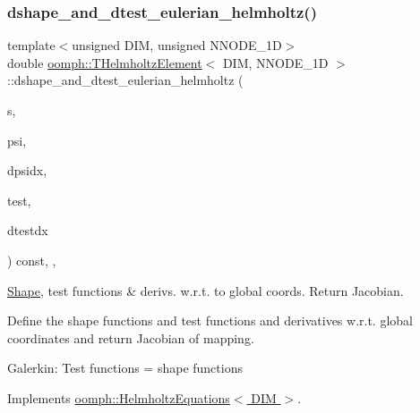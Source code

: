 \mbox{\label{classoomph_1_1THelmholtzElement_a885ded754f152323f82c83acb5b57887}} 
\subsubsection{\texorpdfstring{dshape\+\_\+and\+\_\+dtest\+\_\+eulerian\+\_\+helmholtz()}{dshape\_and\_dtest\_eulerian\_helmholtz()}}
{\footnotesize\ttfamily template$<$unsigned D\+IM, unsigned N\+N\+O\+D\+E\+\_\+1D$>$ \\
double \hyperlink{classoomph_1_1THelmholtzElement}{oomph\+::\+T\+Helmholtz\+Element}$<$ D\+IM, N\+N\+O\+D\+E\+\_\+1D $>$\+::dshape\+\_\+and\+\_\+dtest\+\_\+eulerian\+\_\+helmholtz (\begin{DoxyParamCaption}\item[{const \hyperlink{classoomph_1_1Vector}{Vector}$<$ double $>$ \&}]{s,  }\item[{\hyperlink{classoomph_1_1Shape}{Shape} \&}]{psi,  }\item[{\hyperlink{classoomph_1_1DShape}{D\+Shape} \&}]{dpsidx,  }\item[{\hyperlink{classoomph_1_1Shape}{Shape} \&}]{test,  }\item[{\hyperlink{classoomph_1_1DShape}{D\+Shape} \&}]{dtestdx }\end{DoxyParamCaption}) const\hspace{0.3cm}{\ttfamily [inline]}, {\ttfamily [protected]}, {\ttfamily [virtual]}}



\hyperlink{classoomph_1_1Shape}{Shape}, test functions \& derivs. w.\+r.\+t. to global coords. Return Jacobian. 

Define the shape functions and test functions and derivatives w.\+r.\+t. global coordinates and return Jacobian of mapping.

Galerkin\+: Test functions = shape functions 

Implements \hyperlink{classoomph_1_1HelmholtzEquations_a9a64bff0cb0c873e50eba0f39ace79f1}{oomph\+::\+Helmholtz\+Equations$<$ D\+I\+M $>$}.



